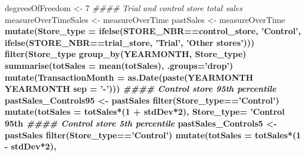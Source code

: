 \documentclass[]{article}
\newenvironment{Shaded}{\begin{snugshade}}{\end{snugshade}}
\newcommand{\CommentTok}[1]{\textcolor[rgb]{0.56,0.35,0.01}{\textit{#1}}}
\newcommand{\DataTypeTok}[1]{\textcolor[rgb]{0.13,0.29,0.53}{#1}}
\newcommand{\DecValTok}[1]{\textcolor[rgb]{0.00,0.00,0.81}{#1}}
\newcommand{\KeywordTok}[1]{\textcolor[rgb]{0.13,0.29,0.53}{\textbf{#1}}}
\newcommand{\NormalTok}[1]{#1}
\newcommand{\OperatorTok}[1]{\textcolor[rgb]{0.81,0.36,0.00}{\textbf{#1}}}
\newcommand{\StringTok}[1]{\textcolor[rgb]{0.31,0.60,0.02}{#1}}
\begin{document}
\begin{Shaded}
\begin{Highlighting}[]
\NormalTok{degreesOfFreedom <-}\StringTok{ }\DecValTok{7}
\CommentTok{#### Trial and control store total sales}
\NormalTok{measureOverTimeSales <-}\StringTok{ }\NormalTok{measureOverTime}
\NormalTok{pastSales <-}\StringTok{ }\NormalTok{measureOverTime }\OperatorTok{%
\StringTok{  }\KeywordTok{mutate}\NormalTok{(}\DataTypeTok{Store_type =} \KeywordTok{ifelse}\NormalTok{(STORE_NBR}\OperatorTok{==}\NormalTok{control_store, }\StringTok{'Control'}\NormalTok{,}
                             \KeywordTok{ifelse}\NormalTok{(STORE_NBR}\OperatorTok{==}\NormalTok{trial_store, }\StringTok{'Trial'}\NormalTok{,}
                                    \StringTok{'Other stores'}\NormalTok{))) }\OperatorTok{%
\StringTok{  }\KeywordTok{filter}\NormalTok{(Store_type }\OperatorTok{%
\StringTok{  }\KeywordTok{group_by}\NormalTok{(YEARMONTH, Store_type) }\OperatorTok{%
\StringTok{  }\KeywordTok{summarise}\NormalTok{(}\DataTypeTok{totSales =} \KeywordTok{mean}\NormalTok{(totSales), }\DataTypeTok{.groups=}\StringTok{'drop'}\NormalTok{) }\OperatorTok{%
\StringTok{  }\KeywordTok{mutate}\NormalTok{(}\DataTypeTok{TransactionMonth =} \KeywordTok{as.Date}\NormalTok{(}\KeywordTok{paste}\NormalTok{(YEARMONTH }\OperatorTok{%
\NormalTok{                                          YEARMONTH }\OperatorTok{%
                                          \DataTypeTok{sep =} \StringTok{'-'}\NormalTok{)))}
\CommentTok{#### Control store 95th percentile}
\NormalTok{pastSales_Controls95 <-}\StringTok{ }\NormalTok{pastSales }\OperatorTok{%
\StringTok{  }\KeywordTok{filter}\NormalTok{(Store_type}\OperatorTok{==}\StringTok{'Control'}\NormalTok{) }\OperatorTok{%
\StringTok{  }\KeywordTok{mutate}\NormalTok{(}\DataTypeTok{totSales =}\NormalTok{ totSales}\OperatorTok{*}\NormalTok{(}\DecValTok{1} \OperatorTok{+}\StringTok{ }\NormalTok{stdDev}\OperatorTok{*}\DecValTok{2}\NormalTok{),}
         \DataTypeTok{Store_type=} \StringTok{'Control 95th %
\CommentTok{#### Control store 5th percentile}
\NormalTok{pastSales_Controls5 <-}\StringTok{ }\NormalTok{pastSales }\OperatorTok{%
\StringTok{  }\KeywordTok{filter}\NormalTok{(Store_type}\OperatorTok{==}\StringTok{'Control'}\NormalTok{) }\OperatorTok{%
\StringTok{  }\KeywordTok{mutate}\NormalTok{(}\DataTypeTok{totSales =}\NormalTok{ totSales}\OperatorTok{*}\NormalTok{(}\DecValTok{1} \OperatorTok{-}\StringTok{ }\NormalTok{stdDev}\OperatorTok{*}\DecValTok{2}\NormalTok{),}
}}}}}}}}}}}}
\end{Highlighting}
\end{Shaded}
\end{document}
